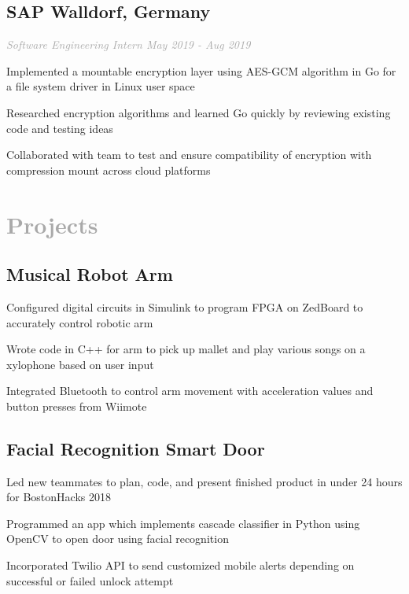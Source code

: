\documentclass{article}
\begin{document}
{	\subsection{{\bfseries\large SAP} \hfill Walldorf, Germany}
	\textit{\textcolor{darkgray}{Software Engineering Intern \hfill \textit{May 2019 - Aug 2019}}}
	\begin{myitemize}
		\item Implemented a mountable encryption layer using AES-GCM algorithm in Go for a file system driver in Linux user space
		\item Researched encryption algorithms and learned Go quickly by reviewing existing code and testing ideas
		\item Collaborated with team to test and ensure compatibility of encryption with compression mount across cloud platforms
	\end{myitemize}
	

\section[Projects \& Research \hfill]{\textcolor{darkgray}{Projects \sout{\hfill}}}
    \subsection{\bfseries\large Musical Robot Arm}
    \begin{myitemize}
        \item Configured digital circuits in Simulink to program FPGA on ZedBoard to accurately control robotic arm
        \item Wrote code in C++ for arm to pick up mallet and play various songs on a xylophone based on  user input
        \item Integrated Bluetooth to control arm movement with acceleration values and button presses from Wiimote
    \end{myitemize}

    \subsection{\bfseries\large Facial Recognition Smart Door}
    \begin{myitemize}
    	  \item Led new teammates to plan, code, and present finished product in under 24 hours for BostonHacks 2018
        \item Programmed an app which implements cascade classifier in Python using OpenCV to open door using facial recognition
        \item Incorporated Twilio API to send customized mobile alerts depending on successful or failed unlock attempt
    \end{myitemize}

}
\end{document}
